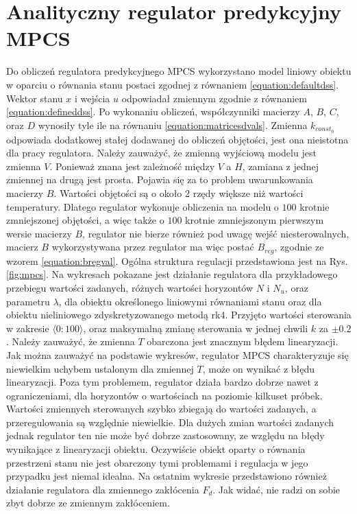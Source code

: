 \section{Analityczny regulator predykcyjny MPCS}
Do obliczeń regulatora predykcyjnego MPCS wykorzystano model liniowy obiektu w oparciu o równania stanu postaci zgodnej z równaniem \ref{equation:defaultdss}. Wektor stanu $x$ i wejścia $u$ odpowiadał zmiennym zgodnie z równaniem \ref{equation:defineddss}. Po wykonaniu obliczeń, współczynniki macierzy $A$, $B$, $C$, oraz $D$ wynosiły tyle ile na równaniu \ref{equation:matricesdvals}. Zmienna $k_{const_0}$ odpowiada dodatkowej stałej dodawanej do obliczeń objętości, jest ona nieistotna dla pracy regulatora. Należy zauważyć, że zmienną wyjściową modelu jest zmienna $V$. Ponieważ znana jest zależność między $V$ a $H$, zamiana z jednej zmiennej na drugą jest prosta. Pojawia się za to problem uwarunkowania macierzy $B$. Wartości objętości są o około 2 rzędy większe niż wartości temperatury. Dlatego regulator wykonuje obliczenia na modelu o $100$ krotnie zmniejszonej objętości, a więc także o $100$ krotnie zmniejszonym pierwszym wersie macierzy $B$, regulator nie bierze również pod uwagę wejść niesterowalnych, macierz $B$ wykorzystywana przez regulator ma więc postać $B_{reg}$, zgodnie ze wzorem \ref{equation:bregval}. Ogólna struktura regulacji przedstawiona jest na Rys. \ref{fig:mpcs}. Na wykresach pokazane jest działanie regulatora dla przykładowego przebiegu wartości zadanych, różnych wartości horyzontów $N$ i $N_u$, oraz parametru $\lambda$, dla obiektu określonego liniowymi równaniami stanu oraz dla obiektu nieliniowego zdyskretyzowanego metodą rk4. Przyjęto wartości sterowania w zakresie $\langle 0 : 100 \rangle$, oraz maksymalną zmianę sterowania w jednej chwili $k$ za $\pm0.2$. Należy zauważyć, że zmienna $T$ obarczona jest znacznym błędem linearyzacji. Jak można zauważyć na podstawie wykresów, regulator MPCS charakteryzuje się niewielkim uchybem ustalonym dla zmiennej $T$, może on wynikać z błędu linearyzacji. Poza tym problemem, regulator działa bardzo dobrze nawet z ograniczeniami, dla horyzontów o wartościach na poziomie kilkuset próbek. Wartości zmiennych sterowanych szybko zbiegają do wartości zadanych, a przeregulowania są względnie niewielkie. Dla dużych zmian wartości zadanych jednak regulator ten nie może być dobrze zastosowany, ze względu na błędy wynikające z linearyzacji obiektu. Oczywiście obiekt oparty o równania przestrzeni stanu nie jest obarczony tymi problemami i regulacja w jego przypadku jest niemal idealna. Na ostatnim wykresie przedstawiono również działanie regulatora dla zmiennego zakłócenia $F_d$. Jak widać, nie radzi on sobie zbyt dobrze ze zmiennym zakłóceniem.


